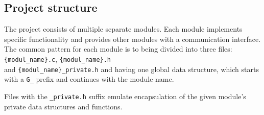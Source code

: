 \documentclass[12pt]{article}
\begin{document}
\subsection{Project structure}
	The project consists of multiple separate modules. Each module implements specific functionality and provides other modules with a communication interface. The common pattern for each module is to being divided into three files: \texttt{\{modul\_name\}.c}, \texttt{\{modul\_name\}.h} \\and \texttt{\{modul\_name\}\_private.h} and having one global data structure, which starts with a \texttt{G\_} prefix and continues with the module name.\par
	Files with the \texttt{\_private.h} suffix emulate encapsulation of the given module's private data structures and functions. \par
\end{document}
